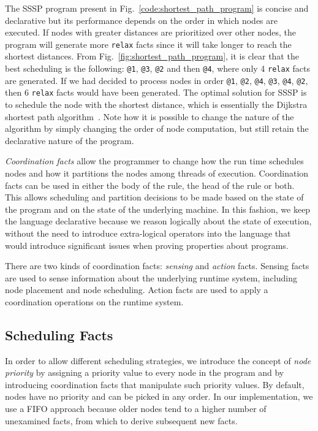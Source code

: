 The SSSP program present in Fig.~\ref{code:shortest_path_program} is concise and
declarative but its performance depends on the order in which nodes are
executed. If nodes with greater distances are prioritized over other nodes, the
program will generate more \texttt{relax} facts since it will take longer to
reach the shortest distances. From Fig.~\ref{fig:shortest_path_program}, it is
clear that the best scheduling is the following: \texttt{@1},
\texttt{@3}, \texttt{@2} and then \texttt{@4}, where only 4 \texttt{relax}
facts are generated. If we had decided to process nodes in order
\texttt{@1}, \texttt{@2}, \texttt{@4}, \texttt{@3}, \texttt{@4},
\texttt{@2}, then 6 \texttt{relax} facts would have been generated.
The optimal solution for SSSP is to schedule the node with the
shortest distance, which is essentially the Dijkstra shortest path
algorithm~\cite{Dijkstra}. Note how it is possible to change the nature of
the algorithm by simply changing the order of node computation, but still
retain the declarative nature of the program.

\emph{Coordination facts} allow the programmer
to change how the run time schedules nodes and how it partitions the nodes among
threads of execution. Coordination facts can be used in either the body of the
rule, the head of the rule or both.
This allows scheduling and partition decisions to be made based on the state of
the program and on the state of the underlying machine.
In this fashion, we keep the language declarative because we reason logically
about the state of execution, without the need to introduce extra-logical
operators into the language that would introduce significant issues when proving
properties about programs.

There are two kinds of coordination facts: \emph{sensing} and \emph{action}
facts. Sensing facts are used to sense information about the
underlying runtime system, including node placement and node scheduling.
Action facts are used to apply a coordination operations on the runtime system.

\subsection{Scheduling Facts}\label{sec:fifo}

In order to allow different scheduling strategies, we introduce the concept of
\emph{node priority} by assigning a priority value to every node in the program
and by introducing coordination facts that manipulate such priority values.
By default, nodes have no priority and can be picked in any order. In
our implementation, we use a FIFO approach because
older nodes tend to a higher number of unexamined facts, from which to derive
subsequent new facts.

